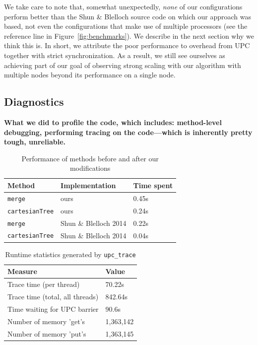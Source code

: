 \documentclass[10pt]{article}
\begin{document}
We take care to note that, somewhat unexpectedly, \emph{none} of our configurations perform better
than the Shun \& Blelloch source code on which our approach was based, not even the configurations
that make use of multiple processors (see the reference line in Figure~\ref{fig:benchmarks}).
We describe in the next section why we think this is.
In short, we attribute the poor performance to overhead from UPC together with strict 
synchronization.
As a result, we still see ourselves as achieving part of our goal of observing strong scaling with
our algorithm with multiple nodes beyond its performance on a single node.

\subsection{Diagnostics}

\textbf{%
What we did to profile the code, which includes:
method-level debugging,
performing tracing on the code---which is inherently pretty tough, unreliable.
}

\begin{table}[t]
\caption{Performance of methods before and after our modifications}
\vspace{1.5ex}
\label{tab:method_performance}
\centering
\begin{tabular}{lll}
\toprule
\textbf{Method} & \textbf{Implementation} & \textbf{Time spent} \\
\midrule
\texttt{merge} & ours & 0.45s \\
\midrule
\texttt{cartesianTree} & ours & 0.24s \\
\midrule
\texttt{merge} & Shun \& Blelloch 2014 & 0.22s \\
\midrule
\texttt{cartesianTree} & Shun \& Blelloch 2014 & 0.04s \\
\end{tabular}
\end{table}

\begin{table}[t]
\caption{Runtime statistics generated by \texttt{upc\_trace}}
\vspace{1.5ex}
\label{tab:profiling_diagnostics}
\centering
\begin{tabular}{ll}
\toprule
\textbf{Measure} & \textbf{Value} \\
\midrule
Trace time (per thread) & 70.22s \\ \midrule
Trace time (total, all threads) & 842.64s \\ \midrule
Time waiting for UPC barrier & 90.6s \\ \midrule
Number of memory 'get's & 1,363,142 \\ \midrule
Number of memory 'put's & 1,363,145 \\ \midrule
\end{tabular}
\end{table}
\end{document}
